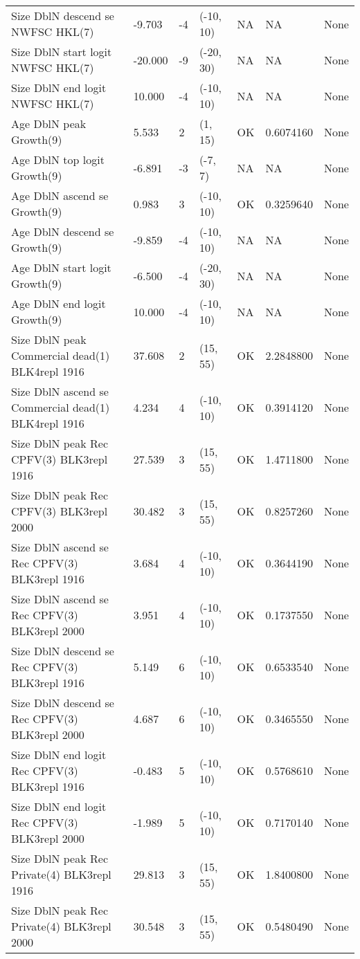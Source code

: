 \documentclass[11pt,
  english,
  letterpaper,
]{article}
\begin{document}
\begin{landscape}
\begin{longtable}[t]{>{\raggedright\arraybackslash}p{7cm}lllll>{\raggedright\arraybackslash}p{4cm}}
Size DblN descend se NWFSC HKL(7) & -9.703 & -4 & (-10, 10) & NA & NA & None\\
Size DblN start logit NWFSC HKL(7) & -20.000 & -9 & (-20, 30) & NA & NA & None\\
Size DblN end logit NWFSC HKL(7) & 10.000 & -4 & (-10, 10) & NA & NA & None\\
Age DblN peak Growth(9) & 5.533 & 2 & (1, 15) & OK & 0.6074160 & None\\
Age DblN top logit Growth(9) & -6.891 & -3 & (-7, 7) & NA & NA & None\\
Age DblN ascend se Growth(9) & 0.983 & 3 & (-10, 10) & OK & 0.3259640 & None\\
Age DblN descend se Growth(9) & -9.859 & -4 & (-10, 10) & NA & NA & None\\
Age DblN start logit Growth(9) & -6.500 & -4 & (-20, 30) & NA & NA & None\\
Age DblN end logit Growth(9) & 10.000 & -4 & (-10, 10) & NA & NA & None\\
Size DblN peak Commercial dead(1) BLK4repl 1916 & 37.608 & 2 & (15, 55) & OK & 2.2848800 & None\\
Size DblN ascend se Commercial dead(1) BLK4repl 1916 & 4.234 & 4 & (-10, 10) & OK & 0.3914120 & None\\
Size DblN peak Rec CPFV(3) BLK3repl 1916 & 27.539 & 3 & (15, 55) & OK & 1.4711800 & None\\
Size DblN peak Rec CPFV(3) BLK3repl 2000 & 30.482 & 3 & (15, 55) & OK & 0.8257260 & None\\
Size DblN ascend se Rec CPFV(3) BLK3repl 1916 & 3.684 & 4 & (-10, 10) & OK & 0.3644190 & None\\
Size DblN ascend se Rec CPFV(3) BLK3repl 2000 & 3.951 & 4 & (-10, 10) & OK & 0.1737550 & None\\
Size DblN descend se Rec CPFV(3) BLK3repl 1916 & 5.149 & 6 & (-10, 10) & OK & 0.6533540 & None\\
Size DblN descend se Rec CPFV(3) BLK3repl 2000 & 4.687 & 6 & (-10, 10) & OK & 0.3465550 & None\\
Size DblN end logit Rec CPFV(3) BLK3repl 1916 & -0.483 & 5 & (-10, 10) & OK & 0.5768610 & None\\
Size DblN end logit Rec CPFV(3) BLK3repl 2000 & -1.989 & 5 & (-10, 10) & OK & 0.7170140 & None\\
Size DblN peak Rec Private(4) BLK3repl 1916 & 29.813 & 3 & (15, 55) & OK & 1.8400800 & None\\
Size DblN peak Rec Private(4) BLK3repl 2000 & 30.548 & 3 & (15, 55) & OK & 0.5480490 & None\\

\end{longtable}
\end{landscape}
\end{document}
